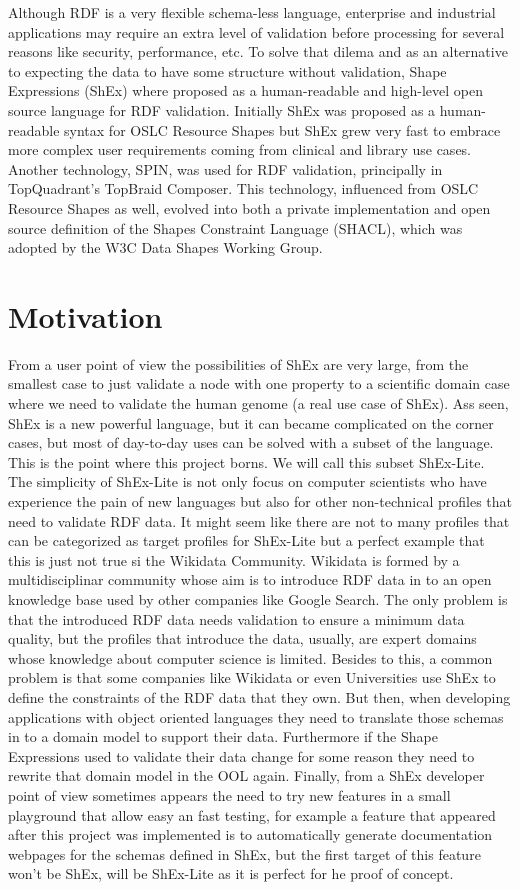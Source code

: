 Although RDF is a very flexible schema-less language, enterprise and industrial applications may require an extra level of validation before processing for several reasons like security, performance, etc.
To solve that dilema and as an alternative to expecting the data to have some structure without validation, Shape Expressions (ShEx) where proposed as a human-readable and high-level open source language for RDF validation. Initially ShEx was proposed as a human-readable syntax for OSLC Resource Shapes \cite{ryman2013oslc} but ShEx grew very fast to embrace more complex user requirements coming from clinical and library use cases.
Another technology, SPIN, was used for RDF validation, principally in TopQuadrant’s TopBraid Composer. This technology, influenced from OSLC Resource Shapes as well, evolved into both a private implementation and open source definition of the Shapes Constraint Language (SHACL), which was adopted by the W3C Data Shapes Working Group.

\section{Motivation}

From a user point of view the possibilities of ShEx are very large, from the smallest case to just validate a node with one property to a scientific domain case where we need to validate the human genome (a real use case of ShEx). Ass seen, ShEx is a new powerful language, but it can became complicated on the corner cases, but most of day-to-day uses can be solved with a subset of the language. This is the point where this project borns. We will call this subset ShEx-Lite. The simplicity of ShEx-Lite is not only focus on computer scientists who have experience the pain of new languages but also for other non-technical profiles that need to validate RDF data.
It might seem like there are not to many profiles that can be categorized as target profiles for ShEx-Lite but a perfect example that this is just not true si the Wikidata Community. Wikidata is formed by a multidisciplinar community whose aim is to introduce RDF data in to an open knowledge base used by other companies like Google Search. The only problem is that the introduced RDF data needs validation to ensure a minimum data quality, but the profiles that introduce the data, usually, are expert domains whose knowledge about computer science is limited.
Besides to this, a common problem is that some companies like Wikidata or even Universities use ShEx to define the constraints of the RDF data that they own. But then, when developing applications with object oriented languages they need to translate those schemas in to a domain model to support their data. Furthermore if the Shape Expressions used to validate their data change for some reason they need to rewrite that domain model in the OOL again.
Finally, from a ShEx developer point of view sometimes appears the need to try new features in a small playground that allow easy an fast testing, for example a feature that appeared after this project was implemented is to automatically generate documentation webpages for the schemas defined in ShEx, but the first target of this feature won’t be ShEx, will be ShEx-Lite as it is perfect for he proof of concept.

